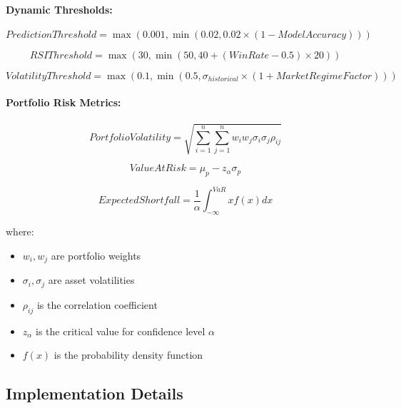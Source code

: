 \documentclass[conference]{IEEEtran}
\begin{document}
\paragraph{Dynamic Thresholds:}
\begin{equation}
PredictionThreshold = \max(0.001, \min(0.02, 0.02 \times (1 - ModelAccuracy)))
\end{equation}

\begin{equation}
RSIThreshold = \max(30, \min(50, 40 + (WinRate - 0.5) \times 20))
\end{equation}

\begin{equation}
VolatilityThreshold = \max(0.1, \min(0.5, \sigma_{historical} \times (1 + MarketRegimeFactor)))
\end{equation}

\paragraph{Portfolio Risk Metrics:}
\begin{equation}
PortfolioVolatility = \sqrt{\sum_{i=1}^n \sum_{j=1}^n w_i w_j \sigma_i \sigma_j \rho_{ij}}
\end{equation}

\begin{equation}
ValueAtRisk = \mu_p - z_\alpha \sigma_p
\end{equation}

\begin{equation}
ExpectedShortfall = \frac{1}{\alpha} \int_{-\infty}^{VaR} x f(x) dx
\end{equation}

where:
\begin{itemize}
    \item $w_i, w_j$ are portfolio weights
    \item $\sigma_i, \sigma_j$ are asset volatilities
    \item $\rho_{ij}$ is the correlation coefficient
    \item $z_\alpha$ is the critical value for confidence level $\alpha$
    \item $f(x)$ is the probability density function
\end{itemize}

\subsection{Implementation Details}
\end{document}
